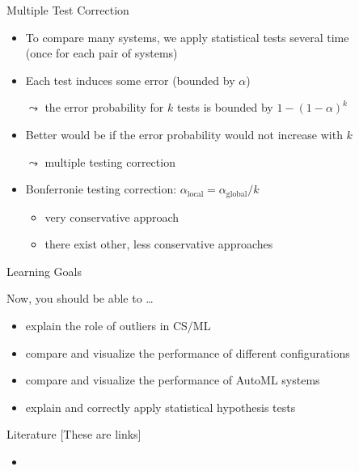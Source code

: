 \begin{frame}[c]{Multiple Test Correction}

\begin{itemize}
	\item To compare many systems, we apply statistical tests several time\\
	(once for each pair of systems)
	\item Each test induces some error (bounded by $\alpha$)
	\item[$\leadsto$] the error probability for $k$ tests is bounded by $1 - (1 - \alpha)^k$
	\pause
	\smallskip
	\item Better would be if the error probability would not increase with $k$
	\item[$\leadsto$] multiple testing correction
	\pause
	\smallskip
	\item Bonferronie testing correction: $\alpha_{\text{local}} = \alpha_{\text{global}} / k$
	\pause
	\begin{itemize}
		\item very conservative approach
		\item there exist other, less conservative approaches
	\end{itemize}
	
\end{itemize}

\end{frame}
\begin{frame}[c]{Learning Goals}

Now, you should be able to \ldots

\begin{itemize}
	\item explain the role of outliers in CS/ML
	\item compare and visualize the performance of different configurations
	\item compare and visualize the performance of AutoML systems
	\item explain and correctly apply statistical hypothesis tests\end{itemize}
\end{frame}
\begin{frame}[c]{Literature [These are links]}

\begin{itemize}
	\item {}		
\end{itemize}

\end{frame}
